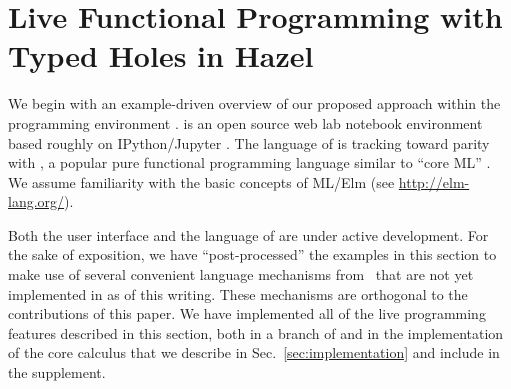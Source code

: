 \newcommand{\examplesSec}{Live Functional Programming with Typed Holes in Hazel}
\section{\protect\examplesSec} %
\label{sec:examples}




\newcommand{\overviewExample}[2]{\paragraph{Example {#1}: {#2}}}

We begin with an example-driven overview of our proposed approach  within the \Hazel programming environment \citet{HazelnutSNAPL}. \Hazel is an open source web lab notebook environment based roughly on IPython/Jupyter \cite{Perez:2007:ISI:1251563.1251831}. The language of \Hazel is tracking toward parity with \Elm, a popular pure functional programming language similar to ``core ML'' \cite{czaplicki2012elm,Elm}. We assume familiarity with the basic concepts of ML/Elm (see \url{http://elm-lang.org/}).

Both the user interface and the language of \Hazel are under active development. For the sake of 
exposition, we have ``post-processed'' the examples in this section to make use of several convenient language mechanisms from \Elm~that are not yet implemented in \Hazel as of this writing. These mechanisms are orthogonal to the contributions of this paper. We have implemented all of the live programming features described in this section, both in a branch of \Hazel and in the implementation of the core calculus that we describe in Sec.~\ref{sec:implementation} and include in the supplement.







